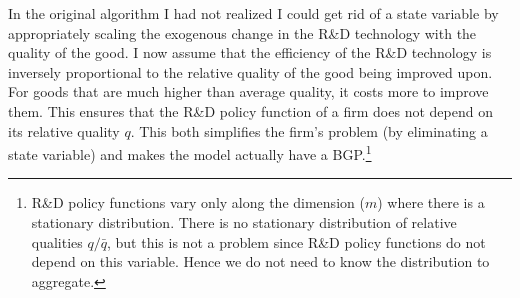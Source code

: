\documentclass[12pt,english]{article}
\theoremstyle{remark}
\begin{document}
In the original algorithm I had not realized I could get rid of a state variable by appropriately scaling the exogenous change in the R\&D technology with the quality of the good. I now assume that the efficiency of the R\&D technology is inversely proportional to the relative quality of the good being improved upon. For goods that are much higher than average quality, it costs more to improve them. This ensures that the R\&D policy function of a firm does not depend on its relative quality $q$. This both simplifies the firm's problem (by eliminating a state variable) and makes the model actually have a BGP.\footnote{R\&D policy functions vary only along the dimension ($m$) where there is a stationary distribution. There is no stationary distribution of relative qualities $q/\bar{q}$, but this is not a problem since R\&D policy functions do not depend on this variable. Hence we do not need to know the distribution to aggregate.}
\end{document}
